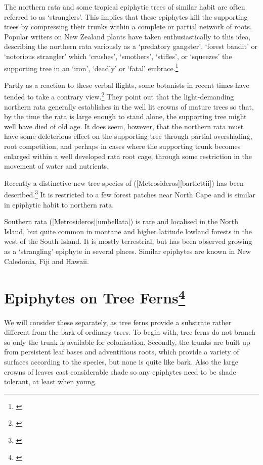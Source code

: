 The northern rata and some tropical epiphytic trees of similar habit are often referred to as `stranglers'.
This implies that these epiphytes kill the supporting trees by compressing their trunks within a complete or partial network of roots.
Popular writers on New Zealand plants have taken enthusiastically to this idea, describing the northern rata variously as a `predatory gangster', `forest bandit' or `notorious strangler' which `crushes', `smothers', `stifles', or `squeezes' the supporting tree in an `iron', `deadly' or `fatal' embrace.\footnote{\cite{druce1971uncle}}

Partly as a reaction to these verbal flights, some botanists in recent times have tended to take a contrary view.\footnote{\cite{zotov1948rata}}
They point out that the light-demanding northern rata generally establishes in the well lit crowns of mature trees so that, by the time the rata is large enough to stand alone, the supporting tree might well have died of old age.
It does seem, however, that the northern rata must have some deleterious effect on the supporting tree through partial overshading, root competition, and perhaps in cases where the supporting trunk becomes enlarged within a well developed rata root cage, through some restriction in the movement of water and nutrients.

Recently a distinctive new tree species of  ([Metrosideros][bartlettii]) has been described.\footnote{\cite{dawson1985metrosideros}}
It is restricted to a few forest patches near North Cape and is similar in epiphytic habit to northern rata.

Southern rata ([Metrosideros][umbellata]) is rare and localised in the North Island, but quite common in montane and higher latitude lowland forests in the west of the South Island.
It is mostly terrestrial, but has been observed growing as a `strangling' epiphyte in several places.
Similar  epiphytes are known in New Caledonia, Fiji and Hawai{\okina}i.

\section[Epiphytes on Tree Ferns]{Epiphytes on Tree Ferns\footnote{\cite{pope1924role}}}

We will consider these separately, as tree ferns provide a substrate rather different from the bark of ordinary trees.
To begin with, tree ferns do not branch so only the trunk is available for colonisation.
Secondly, the trunks are built up from persistent leaf bases and adventitious roots, which provide a variety of surfaces according to the species, but none is quite like bark.
Also the large crowns of leaves cast considerable shade so any epiphytes need to be shade tolerant, at least when young.

